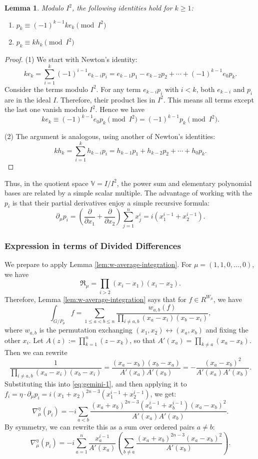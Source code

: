 \documentclass[reqno]{amsart}
\numberwithin{equation}{subsection}
\newtheorem{lemma}[subsubsection]{Lemma}
\theoremstyle{definition}
\def\VV{\mathbb{V}}
\newcommand\frR{\mathfrak{R}}
\newcommand{\nablaop}{\nabla^{\eta}_{\mu}}
\newcommand{\pderiv}[2]{\frac{\partial #1}{\partial #2}}
\begin{document}
\begin{lemma}\label{lem:elementary-polynomial-bases}
Modulo $I^2$, the following identities hold for $k \ge 1$:
\begin{enumerate}
    \item $p_k \equiv (-1)^{k-1} k e_k \pmod{I^2}$
    \item $p_k \equiv k h_k \pmod{I^2}$
\end{enumerate}
\end{lemma}
\begin{proof}
(1) We start with Newton's identity:
$$ k e_k = \sum_{i=1}^{k} (-1)^{i-1} e_{k-i} p_i = e_{k-1}p_1 - e_{k-2}p_2 + \cdots + (-1)^{k-1}e_0 p_k. $$
Consider the terms modulo $I^2$. For any term $e_{k-i} p_i$ with $i < k$, both $e_{k-i}$ and $p_i$ are in the ideal $I$. Therefore, their product lies in $I^2$. This means all terms except the last one vanish modulo $I^2$. Hence we have
$$ k e_k \equiv (-1)^{k-1} e_0 p_k  \pmod{I^2} = (-1)^{k-1} p_k \pmod{I^2}. $$ 

(2) The argument is analogous, using another of Newton's identities: 
$$ k h_k = \sum_{i=1}^{k} h_{k-i} p_i = h_{k-1}p_1 + h_{k-2}p_2 + \cdots + h_0 p_k. $$
\end{proof}

Thus, in the quotient space $\VV = I/I^2$, the power sum and elementary polynomial bases are related by a simple scalar multiple. The advantage of working with the $p_i$ is that their partial derivatives enjoy a simple recursive formula:
$$ \partial_\mu p_i = \left(\pderiv{}{x_1} + \pderiv{}{x_2}\right) \sum_{j=1}^n x_j^i = i(x_1^{i-1} + x_2^{i-1}). $$


\subsubsection{Expression in terms of Divided Differences} We prepare to apply Lemma \ref{lem:w-average-integration}. For $\mu = (1, 1, 0, \ldots, 0)$, we have 
\[
\frR_\mu = \prod_{i >2} (x_i-x_1)(x_i-x_2).
\]
Therefore, Lemma \ref{lem:w-average-integration} says that for $f \in R^{W_\mu}$, we have 
\begin{equation}\label{eq:gemini-1} \int_{G/P_\mu} f = \sum_{1 \le a < b \le n}  \frac{w_{a,b} (f)}{\prod_{i \neq a,b} (x_a-x_i)(x_b-x_i)}, 
\end{equation}
where $w_{a,b}$ is the permutation exchanging $(x_1, x_2) \leftrightarrow (x_a, x_b)$ and fixing the other $x_i$. Let $A(z) := \prod_{k=1}^n(z-x_k)$, so that  $A'(x_a) = \prod_{k \ne a}(x_a-x_k)$. Then we can rewrite
\[
\frac{1}{\prod_{i\neq a,b} (x_a-x_i)(x_b-x_i)} = \frac{(x_a-x_b)(x_b-x_a)}{A'(x_a)A'(x_b)} = - \frac{(x_a-x_b)^2}{A'(x_a)A'(x_b)}.
\]
Substituting this into \eqref{eq:gemini-1}, and then applying it to $f_i = \eta \cdot \partial_\mu p_i  = i (x_1+x_2)^{2n-3}(x_1^{i-1}+x_2^{i-1})$, we get:
$$ \nabla^\eta_\mu(p_i) = -i \sum_{a<b} \frac{(x_a+x_b)^{2n-3}(x_a^{i-1}+x_b^{i-1})(x_a-x_b)^2}{A'(x_a)A'(x_b)}. $$
By symmetry, we can rewrite this as a sum over ordered pairs $a \neq b$:
\begin{equation}\label{eq:nablaop1} \nablaop(p_i) = -i \sum_{a=1}^n \frac{x_a^{i-1}}{A'(x_a)} \left( \sum_{b \ne a} \frac{(x_a+x_b)^{2n-3}(x_a-x_b)^2}{A'(x_b)} \right).
\end{equation}
\end{document}
